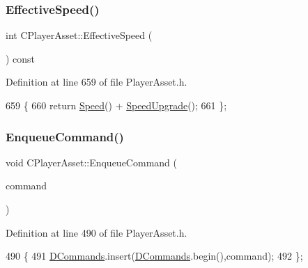\subsubsection{\texorpdfstring{Effective\+Speed()}{EffectiveSpeed()}}
{\footnotesize\ttfamily int C\+Player\+Asset\+::\+Effective\+Speed (\begin{DoxyParamCaption}{ }\end{DoxyParamCaption}) const\hspace{0.3cm}{\ttfamily [inline]}}



Definition at line 659 of file Player\+Asset.\+h.


\begin{DoxyCode}
659                                   \{
660             \textcolor{keywordflow}{return} \hyperlink{classCPlayerAsset_af1c093600f1567e3abf1cefc0f5350d5}{Speed}() + \hyperlink{classCPlayerAsset_a6b6b17c9d4b1fe095120032bee4977af}{SpeedUpgrade}();
661         \};
\end{DoxyCode}
\hypertarget{classCPlayerAsset_a92dcc002f1349cc41c7870495484a442}{}\label{classCPlayerAsset_a92dcc002f1349cc41c7870495484a442} 
\subsubsection{\texorpdfstring{Enqueue\+Command()}{EnqueueCommand()}}
{\footnotesize\ttfamily void C\+Player\+Asset\+::\+Enqueue\+Command (\begin{DoxyParamCaption}\item[{const \hyperlink{structSAssetCommand}{S\+Asset\+Command} \&}]{command }\end{DoxyParamCaption})\hspace{0.3cm}{\ttfamily [inline]}}



Definition at line 490 of file Player\+Asset.\+h.


\begin{DoxyCode}
490                                                          \{
491             \hyperlink{classCPlayerAsset_a4d3b96106d3b1c1020f98005884d2a87}{DCommands}.insert(\hyperlink{classCPlayerAsset_a4d3b96106d3b1c1020f98005884d2a87}{DCommands}.begin(),command);
492         \};
\end{DoxyCode}
\hypertarget{classCPlayerAsset_ab95c988b7c13ed8c686da8f354d120f4}{}\label{classCPlayerAsset_ab95c988b7c13ed8c686da8f354d120f4} 
